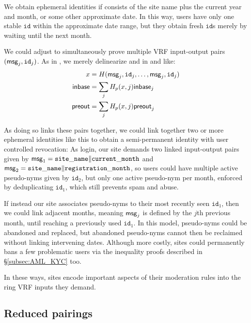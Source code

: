 We obtain ephemeral identities if \msg consists of the site name plus
the current year and month, or some other approximate date.
In this way, users have only one stable $\mathtt{id}$ within the
approximate date range, but they obtain fresh $\mathtt{id}$s merely
by waiting until the next month.

We could adjust \PedVRF to simultaneously prove multiple VRF input-output
pairs $(\mathsf{msg}_j,\mathtt{id}_j)$.
As in \cite{PrivacyPass}, we merely delinearize \In and \PreOut in
\rSign and \rVerify like:
\begin{align*}
x &= H(\mathsf{msg}_j,\mathtt{id}_j,\ldots,\mathsf{msg}_j,\mathtt{id}_j) \\
{\mathsf{inbase}} &= \sum_j H_p(x,j) {\mathsf{inbase}}_j \\
{\mathsf{preout}} &= \sum_j H_p(x,j) {\mathsf{preout}}_j \\
\end{align*}

As doing so links these pairs together,
we could link together two or more ephemeral identities like this
to obtain a semi-permanent identity with user controlled revocation:
As login, our site demands two linked input-output pairs given by
 $\mathsf{msg}_1 = \mathtt{site\_name} \| \mathtt{current\_month}$ and
 $\mathsf{msg}_2 = \mathtt{site\_name} \| \mathtt{registration\_month}$,
so users could have multiple active pseudo-nyms given by $\mathtt{id}_2$,
but only one active pseudo-nym per month, enforced by deduplicating
 $\mathtt{id}_1$, which still prevents spam and abuse.

If instead our site associates pseudo-nyms to their most recently seen
$\mathtt{id}_1$, then we could link adjacent months, meaning $\mathsf{msg}_j$
is defined by the $j$th previous month, until reaching a previously used $\mathtt{id}_1$.
In this model, pseudo-nyms could be abandoned and replaced, but
abandoned pseudo-nyms cannot then be reclaimed without linking intervening dates.
Although more costly, sites could permanently bans a few problematic
users via the inequality proofs described in \S\ref{subsec:AML_KYC} too.

In these ways, sites encode important aspects of their moderation rules
into the ring VRF inputs they demand.  


\subsection{Reduced pairings}
\label{sec:reduced_pairings}

